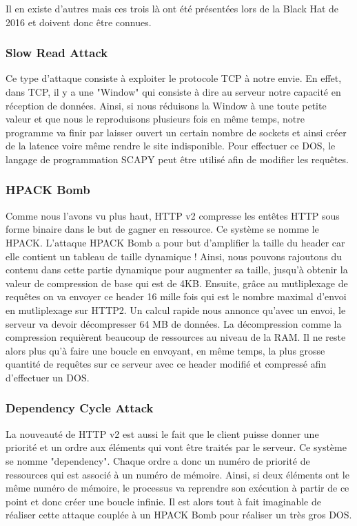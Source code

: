 Il en existe d'autres mais ces trois là ont été présentées lors de la Black Hat de 2016 et doivent donc être connues.

\subsubsection{Slow Read Attack}

Ce type d'attaque consiste à exploiter le protocole TCP à notre envie. En effet, dans TCP, il y a une "Window" qui consiste à dire au serveur notre capacité en réception de données. Ainsi, si nous réduisons la Window à une toute petite valeur et que nous le reproduisons plusieurs fois en même temps, notre programme va finir par laisser ouvert un certain nombre de sockets et ainsi créer de la latence voire même rendre le site indisponible. Pour effectuer ce DOS, le langage de programmation SCAPY peut être utilisé afin de modifier les requêtes.

\subsubsection{HPACK Bomb}

Comme nous l'avons vu plus haut, HTTP v2 compresse les entêtes HTTP sous forme binaire dans le but de gagner en ressource. Ce système se nomme le HPACK. L'attaque HPACK Bomb a pour but d'amplifier la taille du header car elle contient un tableau de taille dynamique ! Ainsi, nous pouvons rajoutons du contenu dans cette partie dynamique pour augmenter sa taille, jusqu'à obtenir la valeur de compression de base qui est de 4KB. Ensuite, grâce au mutliplexage de requêtes on va envoyer ce header 16 mille fois qui est le nombre maximal d'envoi en mutliplexage sur HTTP2. Un calcul rapide nous annonce qu'avec un envoi, le serveur va devoir décompresser 64 MB de données. La décompression comme la compression requièrent beaucoup de ressources au niveau de la RAM. Il ne reste alors plus qu'à faire une boucle en envoyant, en même temps, la plus grosse quantité de requêtes sur ce serveur avec ce header modifié et compressé afin d'effectuer un DOS.

\subsubsection{Dependency Cycle Attack}

La nouveauté de HTTP v2 est aussi le fait que le client puisse donner une priorité et un ordre aux éléments qui vont être traités par le serveur. Ce système se nomme "dependency". Chaque ordre a donc un numéro de priorité de ressources qui est associé à un numéro de mémoire. Ainsi, si deux éléments ont le même numéro de mémoire, le processus va reprendre son exécution à partir de ce point et donc créer une boucle infinie. Il est alors tout à fait imaginable de réaliser cette attaque couplée à un HPACK Bomb pour réaliser un très gros DOS.\\


